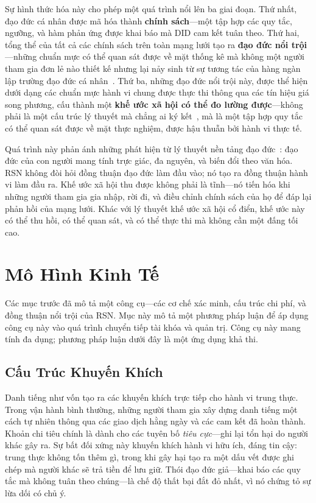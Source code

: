 \documentclass[11pt,a4paper,twocolumn]{article}
\begin{document}
Sự hình thức hóa này cho phép một quá trình nổi lên ba giai đoạn. Thứ nhất, đạo đức cá nhân được mã hóa thành \textbf{chính sách}---một tập hợp các quy tắc, ngưỡng, và hàm phản ứng được khai báo mà DID cam kết tuân theo. Thứ hai, tổng thể của tất cả các chính sách trên toàn mạng lưới tạo ra \textbf{đạo đức nổi trội}---những chuẩn mực có thể quan sát được về mặt thống kê mà không một người tham gia đơn lẻ nào thiết kế nhưng lại nảy sinh từ sự tương tác của hàng ngàn lập trường đạo đức cá nhân~\cite{durkheim1893}. Thứ ba, những đạo đức nổi trội này, được thể hiện dưới dạng các chuẩn mực hành vi chung được thực thi thông qua các tín hiệu giá song phương, cấu thành một \textbf{khế ước xã hội có thể đo lường được}---không phải là một cấu trúc lý thuyết mà chẳng ai ký kết~\cite{rawls1971}, mà là một tập hợp quy tắc có thể quan sát được về mặt thực nghiệm, được hậu thuẫn bởi hành vi thực tế.

Quá trình này phản ánh những phát hiện từ lý thuyết nền tảng đạo đức~\cite{haidt2012}: đạo đức của con người mang tính trực giác, đa nguyên, và biến đổi theo văn hóa. RSN không đòi hỏi đồng thuận đạo đức làm đầu vào; nó tạo ra đồng thuận hành vi làm đầu ra. Khế ước xã hội thu được không phải là tĩnh---nó tiến hóa khi những người tham gia gia nhập, rời đi, và điều chỉnh chính sách của họ để đáp lại phản hồi của mạng lưới. Khác với lý thuyết khế ước xã hội cổ điển, khế ước này có thể thu hồi, có thể quan sát, và có thể thực thi mà không cần một đấng tối cao.

\section{Mô Hình Kinh Tế}

Các mục trước đã mô tả một công cụ---các cơ chế xác minh, cấu trúc chi phí, và đồng thuận nổi trội của RSN. Mục này mô tả một phương pháp luận để áp dụng công cụ này vào quá trình chuyển tiếp tài khóa và quản trị. Công cụ này mang tính đa dụng; phương pháp luận dưới đây là một ứng dụng khả thi.

\subsection{Cấu Trúc Khuyến Khích}

Danh tiếng như vốn tạo ra các khuyến khích trực tiếp cho hành vi trung thực. Trong vận hành bình thường, những người tham gia xây dựng danh tiếng một cách tự nhiên thông qua các giao dịch hằng ngày và các cam kết đã hoàn thành. Khoản chi tiêu chính là dành cho các tuyên bố \emph{tiêu cực}---ghi lại tổn hại do người khác gây ra. Sự bất đối xứng này khuyến khích hành vi hữu ích, đáng tin cậy: trung thực không tốn thêm gì, trong khi gây hại tạo ra một dấu vết được ghi chép mà người khác sẽ trả tiền để lưu giữ. Thói đạo đức giả---khai báo các quy tắc mà không tuân theo chúng---là chế độ thất bại đắt đỏ nhất, vì nó chứng tỏ sự lừa dối có chủ ý.
\end{document}
